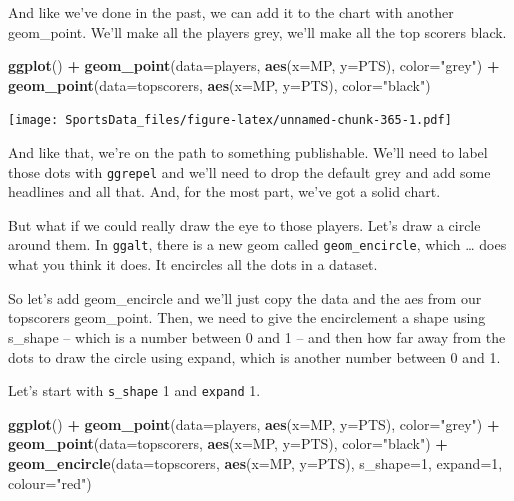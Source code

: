 \documentclass[
]{book}
\newenvironment{Shaded}{\begin{snugshade}}{\end{snugshade}}
\newcommand{\DataTypeTok}[1]{\textcolor[rgb]{0.13,0.29,0.53}{#1}}
\newcommand{\DecValTok}[1]{\textcolor[rgb]{0.00,0.00,0.81}{#1}}
\newcommand{\KeywordTok}[1]{\textcolor[rgb]{0.13,0.29,0.53}{\textbf{#1}}}
\newcommand{\NormalTok}[1]{#1}
\newcommand{\OperatorTok}[1]{\textcolor[rgb]{0.81,0.36,0.00}{\textbf{#1}}}
\newcommand{\StringTok}[1]{\textcolor[rgb]{0.31,0.60,0.02}{#1}}
\begin{document}
And like we've done in the past, we can add it to the chart with another geom\_point. We'll make all the players grey, we'll make all the top scorers black.

\begin{Shaded}
\begin{Highlighting}[]
\KeywordTok{ggplot}\NormalTok{() }\OperatorTok{+}\StringTok{ }\KeywordTok{geom_point}\NormalTok{(}\DataTypeTok{data=}\NormalTok{players, }\KeywordTok{aes}\NormalTok{(}\DataTypeTok{x=}\NormalTok{MP, }\DataTypeTok{y=}\NormalTok{PTS), }\DataTypeTok{color=}\StringTok{"grey"}\NormalTok{) }\OperatorTok{+}\StringTok{ }\KeywordTok{geom_point}\NormalTok{(}\DataTypeTok{data=}\NormalTok{topscorers, }\KeywordTok{aes}\NormalTok{(}\DataTypeTok{x=}\NormalTok{MP, }\DataTypeTok{y=}\NormalTok{PTS), }\DataTypeTok{color=}\StringTok{"black"}\NormalTok{)}
\end{Highlighting}
\end{Shaded}

\texttt{[image: SportsData\_files/figure-latex/unnamed-chunk-365-1.pdf]}

And like that, we're on the path to something publishable. We'll need to label those dots with \texttt{ggrepel} and we'll need to drop the default grey and add some headlines and all that. And, for the most part, we've got a solid chart.

But what if we could really draw the eye to those players. Let's draw a circle around them.
In \texttt{ggalt}, there is a new geom called \texttt{geom\_encircle}, which \ldots{} does what you think it does. It encircles all the dots in a dataset.

So let's add geom\_encircle and we'll just copy the data and the aes from our topscorers geom\_point. Then, we need to give the encirclement a shape using s\_shape -- which is a number between 0 and 1 -- and then how far away from the dots to draw the circle using expand, which is another number between 0 and 1.

Let's start with \texttt{s\_shape} 1 and \texttt{expand} 1.

\begin{Shaded}
\begin{Highlighting}[]
\KeywordTok{ggplot}\NormalTok{() }\OperatorTok{+}\StringTok{ }
\StringTok{  }\KeywordTok{geom_point}\NormalTok{(}\DataTypeTok{data=}\NormalTok{players, }\KeywordTok{aes}\NormalTok{(}\DataTypeTok{x=}\NormalTok{MP, }\DataTypeTok{y=}\NormalTok{PTS), }\DataTypeTok{color=}\StringTok{"grey"}\NormalTok{) }\OperatorTok{+}\StringTok{ }
\StringTok{  }\KeywordTok{geom_point}\NormalTok{(}\DataTypeTok{data=}\NormalTok{topscorers, }\KeywordTok{aes}\NormalTok{(}\DataTypeTok{x=}\NormalTok{MP, }\DataTypeTok{y=}\NormalTok{PTS), }\DataTypeTok{color=}\StringTok{"black"}\NormalTok{) }\OperatorTok{+}\StringTok{ }
\StringTok{  }\KeywordTok{geom_encircle}\NormalTok{(}\DataTypeTok{data=}\NormalTok{topscorers, }\KeywordTok{aes}\NormalTok{(}\DataTypeTok{x=}\NormalTok{MP, }\DataTypeTok{y=}\NormalTok{PTS), }\DataTypeTok{s_shape=}\DecValTok{1}\NormalTok{, }\DataTypeTok{expand=}\DecValTok{1}\NormalTok{, }\DataTypeTok{colour=}\StringTok{"red"}\NormalTok{)}
\end{Highlighting}
\end{Shaded}
\end{document}
